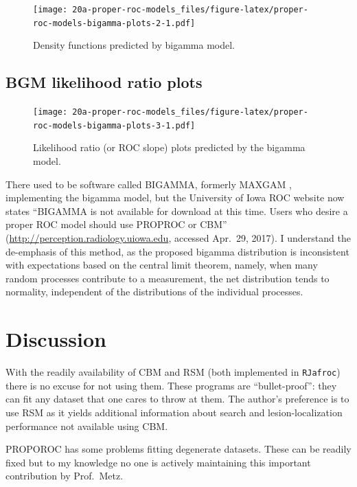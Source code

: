 \documentclass[
]{book}
\begin{document}
\begin{figure}
\centering
\texttt{[image: 20a-proper-roc-models\_files/figure-latex/proper-roc-models-bigamma-plots-2-1.pdf]}
\caption{\label{fig:proper-roc-models-bigamma-plots-2}Density functions predicted by bigamma model.}
\end{figure}

\hypertarget{proper-roc-models-bigamma-slopes}{%
\subsection{BGM likelihood ratio plots}\label{proper-roc-models-bigamma-slopes}}

\begin{figure}
\centering
\texttt{[image: 20a-proper-roc-models\_files/figure-latex/proper-roc-models-bigamma-plots-3-1.pdf]}
\caption{\label{fig:proper-roc-models-bigamma-plots-3}Likelihood ratio (or ROC slope) plots predicted by the bigamma model.}
\end{figure}

There used to be software called BIGAMMA, formerly MAXGAM \citep{dorfman1997proper}, implementing the bigamma model, but the University of Iowa ROC website now states ``BIGAMMA is not available for download at this time. Users who desire a proper ROC model should use PROPROC or CBM'' (\url{http://perception.radiology.uiowa.edu}, accessed Apr.~29, 2017). I understand the de-emphasis of this method, as the proposed bigamma distribution is inconsistent with expectations based on the central limit theorem, namely, when many random processes contribute to a measurement, the net distribution tends to normality, independent of the distributions of the individual processes.

\hypertarget{proper-roc-models-discussion}{%
\section{Discussion}\label{proper-roc-models-discussion}}

With the readily availability of CBM and RSM (both implemented in \texttt{RJafroc}) there is no excuse for not using them. These programs are ``bullet-proof'': they can fit any dataset that one cares to throw at them. The author's preference is to use RSM as it yields additional information about search and lesion-localization performance not available using CBM.

PROPOROC has some problems fitting degenerate datasets. These can be readily fixed but to my knowledge no one is actively maintaining this important contribution by Prof.~Metz.
\end{document}
